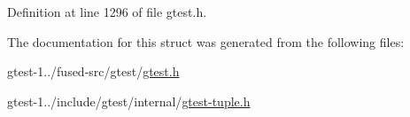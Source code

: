 \-Definition at line 1296 of file gtest.\-h.



\-The documentation for this struct was generated from the following files\-:\begin{DoxyCompactItemize}
\item 
gtest-\/1../fused-\/src/gtest/\hyperlink{fused-src_2gtest_2gtest_8h}{gtest.\-h}\item 
gtest-\/1../include/gtest/internal/\hyperlink{gtest-tuple_8h}{gtest-\/tuple.\-h}\end{DoxyCompactItemize}
